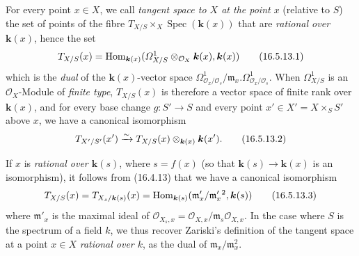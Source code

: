 \begin{env}[16.5.13]\label{IV.16.5.13}
For every point $x\in X$, we call \emph{tangent space to $X$ at the point $x$}
(relative to $S$) the set of points of the fibre
$T_{X/S}\times_X\operatorname{Spec}(\boldsymbol{k}(x))$ that are \emph{rational over $\boldsymbol{k}(x)$},
hence the set
\[
  T_{X/S}(x)=
  \operatorname{Hom}_{\boldsymbol{k}(x)}
  (\varOmega_{X/S}^1\otimes_{\mathcal{O}_X}\boldsymbol{k}(x),\boldsymbol{k}(x))
  \tag{16.5.13.1}
  \label{IV.16.5.13.1}
\]
which is the \emph{dual} of the $\boldsymbol{k}(x)$-vector space
$\Omega_{\mathcal{O}_x/\mathcal{O}_s}^1/
\mathfrak{m}_x.\Omega_{\mathcal{O}_x/\mathcal{O}_s}^1$. When
$\varOmega_{X/S}^1$ is an $\mathcal{O}_X$-Module of \emph{finite type},
$T_{X/S}(x)$ is therefore a vector space of finite rank over $\boldsymbol{k}(x)$, and for
every
base change $g:S'\to S$ and every point
$x'\in X'=X\times_S S'$ above $x$, we have a canonical isomorphism
\[
  T_{X'/S'}(x')\xrightarrow{\sim}
  T_{X/S}(x)\otimes_{\boldsymbol{k}(x)}\boldsymbol{k}(x').
  \tag{16.5.13.2}
  \label{IV.16.5.13.2}
\]

If $x$ is \emph{rational over $\boldsymbol{k}(s)$}, where $s=f(x)$ (so that
$\boldsymbol{k}(s)\to \boldsymbol{k}(x)$ is an isomorphism), it follows from (16.4.13) that we have a
canonical isomorphism
\[
  T_{X/S}(x)=T_{X_s/\boldsymbol{k}(s)}(x)
  =\operatorname{Hom}_{\boldsymbol{k}(s)}
  (\mathfrak{m}'_x/\mathfrak{m}'_x{}^2,\boldsymbol{k}(s))
  \tag{16.5.13.3}
  \label{IV.16.5.13.3}
\]
where $\mathfrak{m}'_x$ is the maximal ideal of
$\mathcal{O}_{X_s,x}=\mathcal{O}_{X,x}/
\mathfrak{m}_s\mathcal{O}_{X,x}$. In the case where $S$ is the spectrum of a
field $k$, we thus recover Zariski's definition of the tangent space at a
point $x\in X$ \emph{rational over $k$}, as the dual of
$\mathfrak{m}_x/\mathfrak{m}_x^2$.


\end{env}
